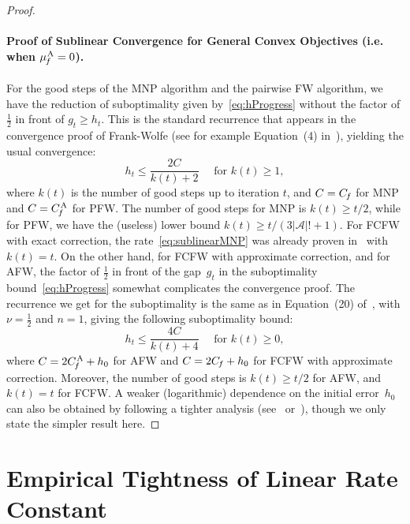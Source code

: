 \documentclass{article} %
\newcommand{\away}{{\hspace{0.06em}\textnormal{\scriptsize A}}}
\newcommand{\Cf}{C_{\hspace{-0.08em}f}}
\newcommand{\CfAFW}{C_{\hspace{-0.08em}f}^\away}
\newcommand{\strongConvAFW}{\mu_{\hspace{-0.08em}f}^\away}
\newcommand{\Vertices}{\mathcal{A}} %
\newcommand{\0}{\mathbf{0}} %
\begin{document}
\begin{proof}
\paragraph{Proof of Sublinear Convergence for General Convex Objectives (i.e. when $\strongConvAFW=0$).} 
For the good steps 
of the MNP algorithm and the pairwise FW algorithm, we have the reduction of suboptimality
given by~\eqref{eq:hProgress} without the factor of $\frac{1}{2}$ in front of $g_t \geq h_t$.
This is the standard recurrence that appears in the convergence proof of Frank-Wolfe
(see for example Equation~(4) in~\citep[proof of Theorem~1]{Jaggi:2013wg}), yielding
the usual convergence:
\begin{equation} \label{eq:sublinearMNP}
h_t \leq \frac{2 C}{k(t) + 2}  \quad \text{ for $k(t) \geq 1$},
\end{equation} 
where $k(t)$ is the number of good steps up to iteration $t$, and $C = \Cf$ for MNP and $C = \CfAFW$ for PFW.
The number of good steps for MNP is $k(t) \geq t/2$, while for PFW, we have the (useless) lower bound
$k(t) \geq t/(3|\Vertices|!+1)$. For FCFW with exact correction, the rate~\eqref{eq:sublinearMNP} was 
already proven in~\citep{Jaggi:2013wg} with $k(t) = t$. On the other hand, for FCFW with approximate correction, and for AFW, the factor of $\frac{1}{2}$ in front of the gap~$g_t$ in the suboptimality bound~\eqref{eq:hProgress}
somewhat complicates the convergence proof. The recurrence we get for the
suboptimality is the same as in Equation~(20) of~\citep[proof of Theorem~C.1]{LacosteJulien:2013ue},
with $\nu = \frac{1}{2}$ and $n=1$, giving the following suboptimality bound:
\begin{equation} \label{eq:sublinearAFW}
h_t \leq \frac{4 C}{k(t) + 4}  \quad \text{ for $k(t) \geq 0$},
\end{equation} 
where $C = 2\CfAFW + h_0$ for AFW and $C = 2\Cf + h_0$ for FCFW with approximate correction.
Moreover, the number of good steps is $k(t) \geq t/2$ for AFW, and $k(t) = t$ for FCFW.
A weaker (logarithmic) dependence on the initial error~$h_0$ can also be obtained by following a tighter
analysis (see~\citep[Theorem~C.4]{LacosteJulien:2013ue} or~\citep[Lemma~D.5 and Theorem~D.6]{Krishnan:2015ws}),
though we only state the simpler result here.
\end{proof}


%
\section{Empirical Tightness of Linear Rate Constant} \label{app:triangle}
\end{document}

